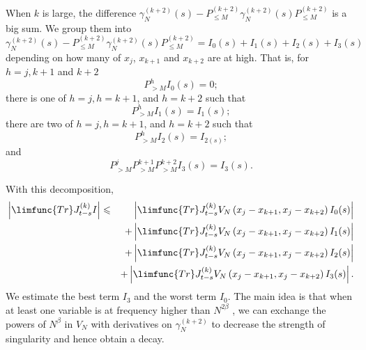 \documentclass[12pt,letterpaper,leqno]{amsart}
\theoremstyle{plain}
\numberwithin{equation}{section}
\numberwithin{theorem}{section}
\numberwithin{proposition}{section}
\numberwithin{lemma}{section}
\numberwithin{corollary}{section}
\begin{document}
When $k$ is large, the difference $\gamma _{N}^{(k+2)}(s)-P_{\leqslant
M}^{(k+2)}\gamma _{N}^{(k+2)}(s)P_{\leqslant M}^{(k+2)}$ is a big sum. We
group them into 
\begin{equation*}
\gamma _{N}^{(k+2)}(s)-P_{\leqslant M}^{(k+2)}\gamma
_{N}^{(k+2)}(s)P_{\leqslant M}^{(k+2)}=I_{0}(s)+I_{1}(s)+I_{2}(s)+I_{3}(s)
\end{equation*}%
depending on how many of $x_{j}$, $x_{k+1}$ and $x_{k+2}$ are at high. That
is, for $h=j,k+1$ and $k+2$ 
\begin{equation*}
P_{>M}^{h}I_{0}(s)=0;
\end{equation*}%
there is one of $h=j,h=k+1$, and $h=k+2$ such that%
\begin{equation*}
P_{>M}^{h}I_{1}(s)=I_{1}(s);
\end{equation*}%
there are two of $h=j,h=k+1$, and $h=k+2$ such that%
\begin{equation*}
P_{>M}^{h}I_{2}(s)=I_{2(s)};
\end{equation*}%
and%
\begin{equation*}
P_{>M}^{j}P_{>M}^{k+1}P_{>M}^{k+2}I_{3}(s)=I_{3}(s).
\end{equation*}

With this decomposition,%
\begin{eqnarray*}
\left\vert \limfunc{Tr}J_{t-s}^{(k)}I\right\vert &\leqslant &\left\vert 
\limfunc{Tr}J_{t-s}^{(k)}V_{N}\left( x_{j}-x_{k+1},x_{j}-x_{k+2}\right)
I_{0}(s)\right\vert \\
&&+\left\vert \limfunc{Tr}J_{t-s}^{(k)}V_{N}\left(
x_{j}-x_{k+1},x_{j}-x_{k+2}\right) I_{1}(s)\right\vert \\
&&+\left\vert \limfunc{Tr}J_{t-s}^{(k)}V_{N}\left(
x_{j}-x_{k+1},x_{j}-x_{k+2}\right) I_{2}(s)\right\vert \\
&&+\left\vert \limfunc{Tr}J_{t-s}^{(k)}V_{N}\left(
x_{j}-x_{k+1},x_{j}-x_{k+2}\right) I_{3}(s)\right\vert .
\end{eqnarray*}%
We estimate the best term $I_{3}$ and the worst term $I_{0}$. The main idea
is that when at least one variable is at frequency higher than $N^{2\beta }$%
, we can exchange the powers of $N^{\beta }$ in $V_{N}$ with derivatives on $%
\gamma _{N}^{(k+2)}$ to decrease the strength of singularity and hence
obtain a decay.
\end{document}
